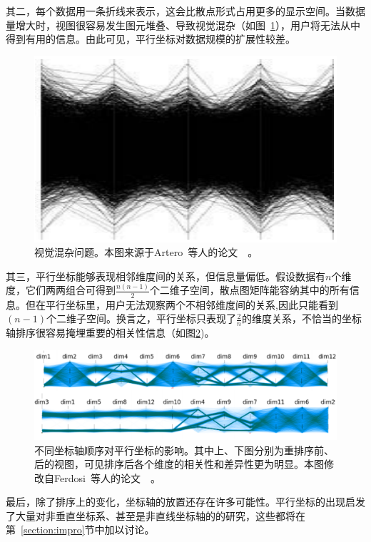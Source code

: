\documentclass[12pt,twocolumn]{article}
\begin{document}
其二，每个数据用一条折线来表示，这会比散点形式占用更多的显示空间。当数据量增大时，视图很容易发生图元堆叠、导致视觉混杂（如图~\ref{fig:PC_clutter}），用户将无法从中得到有用的信息。由此可见，平行坐标对数据规模的扩展性较差。

\begin{figure}[!htb]
\centering
\includegraphics[width=0.8\linewidth]{images/PC_clutter.eps}
\caption{\label{fig:PC_clutter}视觉混杂问题。本图来源于Artero~等人的论文~\citep{artero2004uncovering}~。
}
\end{figure}

其三，平行坐标能够表现相邻维度间的关系，但信息量偏低。假设数据有$n$个维度，它们两两组合可得到$\frac{n(n-1)}{2}$个二维子空间，散点图矩阵能容纳其中的所有信息。但在平行坐标里，用户无法观察两个不相邻维度间的关系,因此只能看到$(n-1)$个二维子空间。换言之，平行坐标只表现了$\frac{2}{n}$的维度关系，不恰当的坐标轴排序很容易掩埋重要的相关性信息（如图\ref{fig:PC_reordering})。

\begin{figure}[!htb]
\centering
\includegraphics[width=1.0\linewidth]{images/PC_reordering.eps}
\caption{\label{fig:PC_reordering}不同坐标轴顺序对平行坐标的影响。其中上、下图分别为重排序前、后的视图，可见排序后各个维度的相关性和差异性更为明显。本图修改自Ferdosi~等人的论文~\citep{ferdosi2011visualizing}~。
}
\end{figure}

最后，除了排序上的变化，坐标轴的放置还存在许多可能性。平行坐标的出现启发了大量对非垂直坐标系、甚至是非直线坐标轴的的研究，这些都将在第~\ref{section:impro}节中加以讨论。
\end{document}
